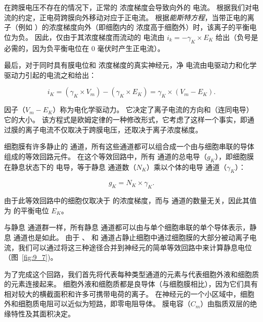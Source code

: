在跨膜电压不存在的情况下，正常的  浓度梯度会导致向外的  电流。
根据我们对电流的约定，正电荷跨膜向外移动对应于正电流。
根据\textit{能斯特方程}，当带正电的离子（例如 ）的浓度梯度向外（即细胞内的  浓度高于细胞外）时，该离子的平衡电位为负。
因此，仅由于其浓度梯度而流动的  电流由 $i_k = -\gamma_K \times E_K$ 给出（负号是必需的，因为负平衡电位在 0 毫伏时产生正电流）。


最后，对于同时具有膜电位和  浓度梯度的真实神经元，净  电流由电驱动力和化学驱动力引起的电流之和给出：

\begin{equation}
	i_K = (\gamma_K \times V_m) - 
		(\gamma_K \times E_K) =
		\gamma_K \times (V_m - E_K).
\end{equation}


因子（$V_m - E_K$）称为电化学驱动力。
它决定了离子电流的方向和（连同电导）它的大小。
该方程式是欧姆定律的一种修改形式，它考虑了这样一个事实，即通过膜的离子电流不仅取决于跨膜电压，还取决于离子浓度梯度。


细胞膜有许多静止的  通道，所有这些通道都可以组合成一个由与细胞串联的导体组成的等效回路元件。
在这个等效回路中，所有  通道的总电导（$g_K$），即细胞膜在静息状态下的  电导，等于静息  通道数（$N_K$）乘以个体的电导 通道（$\gamma_K$）：

\begin{equation}
	g_K = N_K \times \gamma_K.
\end{equation}


由于此等效回路中的细胞仅取决于  的浓度梯度，而与  通道的数量无关，因此其值为  的平衡电位 $E_K$。


与静息  通道群一样，所有静息  通道都可以由与单个细胞串联的单个导体表示，静息  通道也是如此。
由于 、 和  通道占静止细胞中通过细胞膜的大部分被动离子电流，我们可以通过将这三种途径合并到神经元的简单等效回路中来计算静息电位（图~\ref{fig:9_7})。


为了完成这个回路，我们首先将代表每种类型通道的元素与代表细胞外液和细胞质的元素连接起来。
细胞外液和细胞质都是良导体（与细胞膜相比），因为它们具有相对较大的横截面积和许多可携带电荷的离子。
在神经元的一个小区域中，细胞外和细胞质电阻可以近似为短路，即零电阻导体。
膜电容（$C_m$）由脂质双层的绝缘特性及其面积决定。


